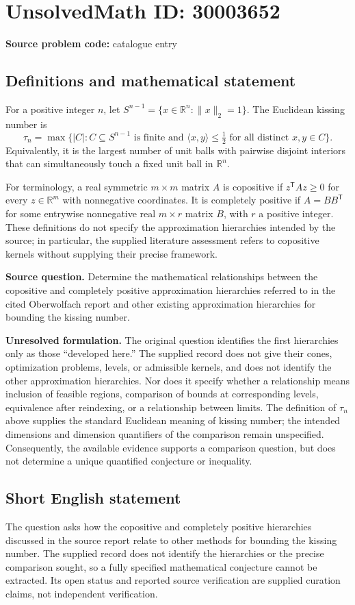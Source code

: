 \documentclass[11pt]{article}
\newcommand{\R}{\mathbb{R}}
\begin{document}
\section*{UnsolvedMath ID: 30003652}
\textbf{Source problem code:} catalogue entry
\subsection{Definitions and mathematical statement}
For a positive integer \(n\), let \(S^{n-1}=\{x\in\R^n:\|x\|_2=1\}\). The Euclidean kissing number is
\[
\tau_n=\max\bigl\{|C|:C\subseteq S^{n-1}\text{ is finite and }\langle x,y\rangle\leq \tfrac12\text{ for all distinct }x,y\in C\bigr\}.
\]
Equivalently, it is the largest number of unit balls with pairwise disjoint interiors that can simultaneously touch a fixed unit ball in \(\R^n\).

For terminology, a real symmetric \(m\times m\) matrix \(A\) is copositive if \(z^{\mathsf T}Az\geq0\) for every \(z\in\R^m\) with nonnegative coordinates. It is completely positive if \(A=BB^{\mathsf T}\) for some entrywise nonnegative real \(m\times r\) matrix \(B\), with \(r\) a positive integer. These definitions do not specify the approximation hierarchies intended by the source; in particular, the supplied literature assessment refers to copositive kernels without supplying their precise framework.

\textbf{Source question.} Determine the mathematical relationships between the copositive and completely positive approximation hierarchies referred to in the cited Oberwolfach report and other existing approximation hierarchies for bounding the kissing number.

\textbf{Unresolved formulation.} The original question identifies the first hierarchies only as those ``developed here.'' The supplied record does not give their cones, optimization problems, levels, or admissible kernels, and does not identify the other approximation hierarchies. Nor does it specify whether a relationship means inclusion of feasible regions, comparison of bounds at corresponding levels, equivalence after reindexing, or a relationship between limits. The definition of \(\tau_n\) above supplies the standard Euclidean meaning of kissing number; the intended dimensions and dimension quantifiers of the comparison remain unspecified. Consequently, the available evidence supports a comparison question, but does not determine a unique quantified conjecture or inequality.
\subsection{Short English statement}
The question asks how the copositive and completely positive hierarchies discussed in the source report relate to other methods for bounding the kissing number. The supplied record does not identify the hierarchies or the precise comparison sought, so a fully specified mathematical conjecture cannot be extracted. Its open status and reported source verification are supplied curation claims, not independent verification.
\end{document}
